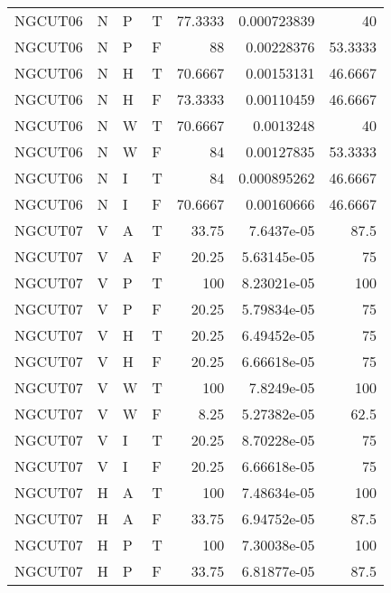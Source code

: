 \begin{longtable}{llllrrr}
    NGCUT06  & N     & P     & T          & 77.3333    & 0.000723839 & 40       \\
    NGCUT06  & N     & P     & F          & 88         & 0.00228376  & 53.3333  \\
    NGCUT06  & N     & H     & T          & 70.6667    & 0.00153131  & 46.6667  \\
    NGCUT06  & N     & H     & F          & 73.3333    & 0.00110459  & 46.6667  \\
    NGCUT06  & N     & W     & T          & 70.6667    & 0.0013248   & 40       \\
    NGCUT06  & N     & W     & F          & 84         & 0.00127835  & 53.3333  \\
    NGCUT06  & N     & I     & T          & 84         & 0.000895262 & 46.6667  \\
    NGCUT06  & N     & I     & F          & 70.6667    & 0.00160666  & 46.6667  \\
    NGCUT07  & V     & A     & T          & 33.75      & 7.6437e-05  & 87.5     \\
    NGCUT07  & V     & A     & F          & 20.25      & 5.63145e-05 & 75       \\
    NGCUT07  & V     & P     & T          & 100        & 8.23021e-05 & 100      \\
    NGCUT07  & V     & P     & F          & 20.25      & 5.79834e-05 & 75       \\
    NGCUT07  & V     & H     & T          & 20.25      & 6.49452e-05 & 75       \\
    NGCUT07  & V     & H     & F          & 20.25      & 6.66618e-05 & 75       \\
    NGCUT07  & V     & W     & T          & 100        & 7.8249e-05  & 100      \\
    NGCUT07  & V     & W     & F          & 8.25       & 5.27382e-05 & 62.5     \\
    NGCUT07  & V     & I     & T          & 20.25      & 8.70228e-05 & 75       \\
    NGCUT07  & V     & I     & F          & 20.25      & 6.66618e-05 & 75       \\
    NGCUT07  & H     & A     & T          & 100        & 7.48634e-05 & 100      \\
    NGCUT07  & H     & A     & F          & 33.75      & 6.94752e-05 & 87.5     \\
    NGCUT07  & H     & P     & T          & 100        & 7.30038e-05 & 100      \\
    NGCUT07  & H     & P     & F          & 33.75      & 6.81877e-05 & 87.5     \\

\end{longtable}
